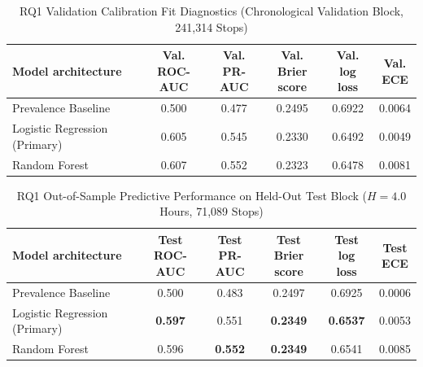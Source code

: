 \documentclass[11pt,a4paper]{article}
\begin{document}
\begin{table}[htbp]
\centering
\caption{RQ1 Validation Calibration Fit Diagnostics (Chronological Validation Block, 241,314 Stops)}
\label{tab:rq1-calibration-fit}
\scriptsize
\setlength{\tabcolsep}{3pt}
\renewcommand{\arraystretch}{1.15}
\begin{tabular}{lccccc}
\toprule
\textbf{Model architecture} & \shortstack{\textbf{Val.}\\\textbf{ROC-AUC}} & \shortstack{\textbf{Val.}\\\textbf{PR-AUC}} & \shortstack{\textbf{Val. Brier}\\\textbf{score}} & \shortstack{\textbf{Val. log}\\\textbf{loss}} & \shortstack{\textbf{Val.}\\\textbf{ECE}} \\
\midrule
Prevalence Baseline & 0.500 & 0.477 & 0.2495 & 0.6922 & 0.0064 \\
Logistic Regression (Primary) & 0.605 & 0.545 & 0.2330 & 0.6492 & 0.0049 \\
Random Forest & 0.607 & 0.552 & 0.2323 & 0.6478 & 0.0081 \\
\bottomrule
\end{tabular}
\end{table}

\begin{table}[htbp]
\centering
\caption{RQ1 Out-of-Sample Predictive Performance on Held-Out Test Block ($H = 4.0$ Hours, 71,089 Stops)}
\label{tab:rq1-test-results}
\scriptsize
\setlength{\tabcolsep}{3pt}
\renewcommand{\arraystretch}{1.15}
\begin{tabular}{lccccc}
\toprule
\textbf{Model architecture} & \shortstack{\textbf{Test}\\\textbf{ROC-AUC}} & \shortstack{\textbf{Test}\\\textbf{PR-AUC}} & \shortstack{\textbf{Test Brier}\\\textbf{score}} & \shortstack{\textbf{Test log}\\\textbf{loss}} & \shortstack{\textbf{Test}\\\textbf{ECE}} \\
\midrule
Prevalence Baseline & 0.500 & 0.483 & 0.2497 & 0.6925 & 0.0006 \\
Logistic Regression (Primary) & \textbf{0.597} & 0.551 & \textbf{0.2349} & \textbf{0.6537} & 0.0053 \\
Random Forest & 0.596 & \textbf{0.552} & \textbf{0.2349} & 0.6541 & 0.0085 \\
\bottomrule
\end{tabular}
\end{table}
\end{document}
